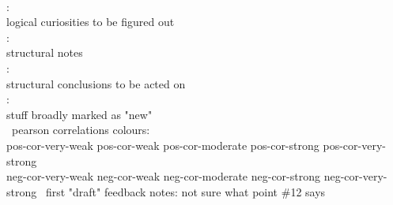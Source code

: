\hfill \\
 : \\logical curiosities to be figured out \\
: \\ structural notes \\
: \\ structural conclusions to be acted on \\
: \\ stuff broadly marked as "new" \\
\
pearson correlations colours: \\
\textcolor{pos-cor-very-weak}  {pos-cor-very-weak}
\textcolor{pos-cor-weak}       {pos-cor-weak}
\textcolor{pos-cor-moderate}   {pos-cor-moderate}
\textcolor{pos-cor-strong}     {pos-cor-strong}
\textcolor{pos-cor-very-strong}{pos-cor-very-strong} \\
\textcolor{neg-cor-very-weak}  {neg-cor-very-weak}
\textcolor{neg-cor-weak}       {neg-cor-weak}
\textcolor{neg-cor-moderate}   {neg-cor-moderate}
\textcolor{neg-cor-strong}     {neg-cor-strong}
\textcolor{neg-cor-very-strong}{neg-cor-very-strong}
\
first "draft" feedback notes: not sure what point \#12 says

